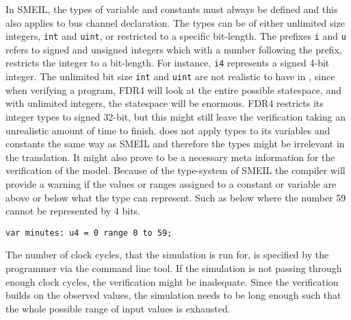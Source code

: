 In SMEIL, the types of variable and constants must always be defined and this also applies to bus channel declaration. The types can be of either unlimited size integers, \texttt{int} and \texttt{uint},  or restricted to a specific bit-length. The prefixes \texttt{i} and \texttt{u} refers to signed and unsigned integers which with a number following the prefix, restricts the integer to a bit-length. For instance, \texttt{i4} represents a signed 4-bit integer.
The unlimited bit size \texttt{int} and \texttt{uint} are not realistic to have in \cspm, since when verifying a program, FDR4 will look at the entire possible statespace, and with unlimited integers, the statespace will be enormous. FDR4 restricts its integer types to signed 32-bit\cite{UniversityofOxford}, but this might still leave the verification taking an unrealistic amount of time to finish. \cspm does not apply types to its variables and constants the same way as SMEIL and therefore the types might be irrelevant in the translation. It might also prove to be a necessary meta information for the verification of the model.
Because of the type-system of SMEIL the compiler will provide a warning if the values or ranges assigned to a constant or variable are above or below what the type can represent. Such as below where the number 59 cannot be represented by 4 bits.
\begin{verbatim}
var minutes: u4 = 0 range 0 to 59;
\end{verbatim}


%



The number of clock cycles, that the simulation is run for, is specified by the programmer via the command line tool. If the simulation is not passing through enough clock cycles, the verification might be inadequate. Since the verification builds on the observed values, the simulation needs to be long enough such that the whole possible range of input values is exhausted. %



